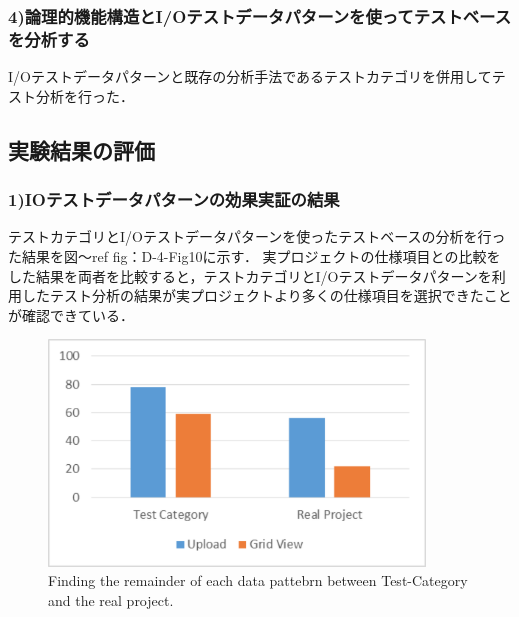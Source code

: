 \documentclass[a4paper,12pt]{jreport}
\begin{document}
\subsubsection{4)論理的機能構造とI/Oテストデータパターンを使ってテストベースを分析する}
I/Oテストデータパターンと既存の分析手法であるテストカテゴリを併用してテスト分析を行った．

\subsection{実験結果の評価}

\subsubsection{1)IOテストデータパターンの効果実証の結果}
テストカテゴリとI/Oテストデータパターンを使ったテストベースの分析を行った結果を図〜ref {fig：D-4-Fig10}に示す．
実プロジェクトの仕様項目との比較をした結果を両者を比較すると，テストカテゴリとI/Oテストデータパターンを利用したテスト分析の結果が実プロジェクトより多くの仕様項目を選択できたことが確認できている．
   \begin{figure}[htbp]
  \begin{center}
  \includegraphics[width=10cm]{./image/D-4-Fig10.png}
  \caption{Finding the remainder of each data pattebrn between Test-Category and the real project.}
  \label{fig:D-4-Fig10}
  \end{center}
   \end{figure}
\end{document}
